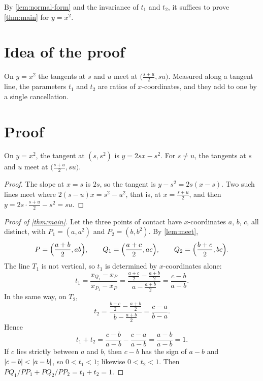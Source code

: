 \documentclass[11pt,a4paper]{article}
\begin{document}
By \cref{lem:normal-form} and the invariance of $t_1$ and $t_2$, it suffices to
prove \cref{thm:main} for $y = x^2$.

\section{Idea of the proof}

On $y = x^2$ the tangents at $s$ and $u$ meet at $\bigl(\frac{s+u}{2}, su\bigr)$.
Measured along a tangent line, the parameters $t_1$ and $t_2$ are ratios of
$x$-coordinates, and they add to one by a single cancellation.

\section{Proof}

\begin{lemma}\label{lem:meet}
  On $y = x^2$, the tangent at $(s, s^2)$ is $y = 2sx - s^2$. For $s \neq u$, the
  tangents at $s$ and $u$ meet at $\bigl(\frac{s+u}{2}, su\bigr)$.
\end{lemma}

\begin{proof}
  The slope at $x = s$ is $2s$, so the tangent is $y - s^2 = 2s(x - s)$. Two such
  lines meet where $2(s - u)x = s^2 - u^2$, that is, at $x = \frac{s+u}{2}$, and then
  $y = 2s \cdot \frac{s+u}{2} - s^2 = su$.
\end{proof}

\begin{proof}[Proof of \cref{thm:main}]
  Let the three points of contact have $x$-coordinates $a$, $b$, $c$, all distinct,
  with $P_1 = (a, a^2)$ and $P_2 = (b, b^2)$. By \cref{lem:meet},
  \[
    P = \Bigl(\frac{a+b}{2}, ab\Bigr), \qquad
    Q_1 = \Bigl(\frac{a+c}{2}, ac\Bigr), \qquad
    Q_2 = \Bigl(\frac{b+c}{2}, bc\Bigr).
  \]
  The line $T_1$ is not vertical, so $t_1$ is determined by $x$-coordinates alone:
  \[
    t_1 = \frac{x_{Q_1} - x_P}{x_{P_1} - x_P}
        = \frac{\frac{a+c}{2} - \frac{a+b}{2}}{a - \frac{a+b}{2}}
        = \frac{c - b}{a - b}.
  \]
  In the same way, on $T_2$,
  \[
    t_2 = \frac{\frac{b+c}{2} - \frac{a+b}{2}}{b - \frac{a+b}{2}} = \frac{c - a}{b - a}.
  \]
  Hence
  \[
    t_1 + t_2 = \frac{c - b}{a - b} - \frac{c - a}{a - b}
    = \frac{a - b}{a - b} = 1.
  \]
  If $c$ lies strictly between $a$ and $b$, then $c - b$ has the sign of $a - b$ and
  $\lvert c - b\rvert < \lvert a - b\rvert$, so $0 < t_1 < 1$; likewise $0 < t_2 < 1$. Then
  $PQ_1/PP_1 + PQ_2/PP_2 = t_1 + t_2 = 1$.
\end{proof}
\end{document}
